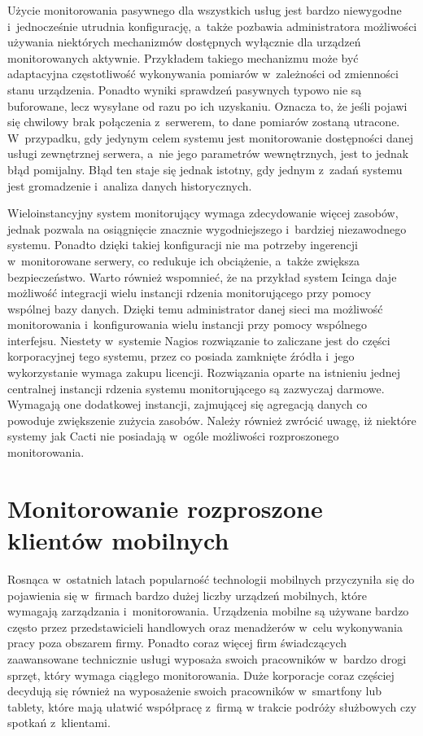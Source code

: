Użycie monitorowania pasywnego dla wszystkich usług jest bardzo
niewygodne i~jednocześnie utrudnia konfigurację, a~także pozbawia
administratora możliwości używania niektórych mechanizmów dostępnych
wyłącznie dla urządzeń monitorowanych aktywnie. Przykładem takiego
mechanizmu może być adaptacyjna częstotliwość wykonywania pomiarów
w~zależności od zmienności stanu urządzenia. Ponadto wyniki sprawdzeń
pasywnych typowo nie są buforowane, lecz wysyłane od razu po ich
uzyskaniu. Oznacza to, że jeśli pojawi się chwilowy brak połączenia
z~serwerem, to dane pomiarów zostaną utracone. W~przypadku, gdy
jedynym celem systemu jest monitorowanie dostępności danej usługi
zewnętrznej serwera, a~nie jego parametrów wewnętrznych, jest to jednak
błąd pomijalny. Błąd ten staje się jednak istotny, gdy jednym z~zadań
systemu jest gromadzenie i~analiza danych historycznych.

Wieloinstancyjny system monitorujący wymaga zdecydowanie więcej
zasobów, jednak pozwala na osiągnięcie znacznie wygodniejszego
i~bardziej niezawodnego systemu. Ponadto dzięki takiej konfiguracji
nie ma potrzeby ingerencji w~monitorowane serwery, co redukuje ich
obciążenie, a~także zwiększa bezpieczeństwo. Warto również wspomnieć,
że na przykład system Icinga daje możliwość integracji wielu instancji
rdzenia monitorującego przy pomocy wspólnej bazy danych. Dzięki temu
administrator danej sieci ma możliwość monitorowania i~konfigurowania
wielu instancji przy pomocy wspólnego interfejsu. Niestety w~systemie
Nagios rozwiązanie to zaliczane jest do części korporacyjnej tego
systemu, przez co posiada zamknięte źródła i~jego wykorzystanie wymaga
zakupu licencji. Rozwiązania oparte na istnieniu jednej centralnej
instancji rdzenia systemu monitorującego są zazwyczaj
darmowe. Wymagają one dodatkowej instancji, zajmującej się agregacją
danych co powoduje zwiększenie zużycia zasobów. Należy również zwrócić
uwagę, iż niektóre systemy jak Cacti nie posiadają w~ogóle możliwości
rozproszonego monitorowania.

\section[Monitorowanie rozproszone][Monitorowanie rozproszone klientów
mobilnych]{Monitorowanie rozproszone klientów mobilnych}

Rosnąca w~ostatnich latach popularność technologii mobilnych
przyczyniła się do pojawienia się w~firmach bardzo dużej liczby
urządzeń mobilnych, które wymagają zarządzania
i~monitorowania. Urządzenia mobilne są używane bardzo często przez
przedstawicieli handlowych oraz menadżerów w~celu wykonywania pracy
poza obszarem firmy. Ponadto coraz więcej firm świadczących
zaawansowane technicznie usługi wyposaża swoich pracowników w~bardzo
drogi sprzęt, który wymaga ciągłego monitorowania. Duże korporacje
coraz częściej decydują się również na wyposażenie swoich pracowników
w~smartfony lub tablety, które mają ułatwić współpracę z~firmą w
trakcie podróży służbowych czy spotkań z~klientami.

